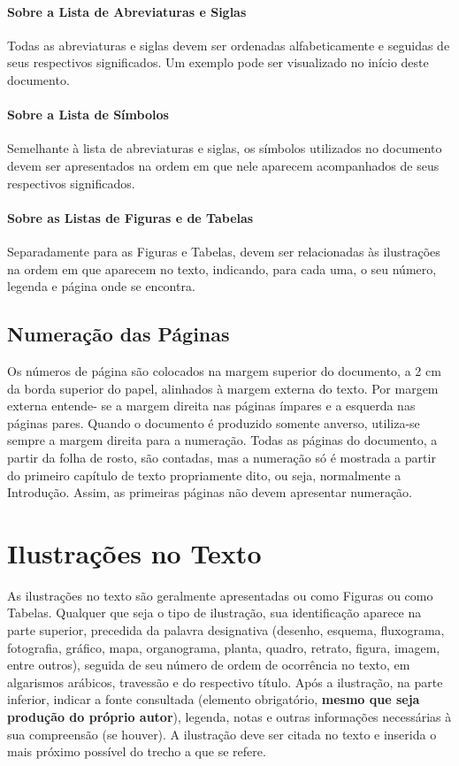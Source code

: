 \documentclass[ppgc,diss]{iiufrgs}
\begin{document}
\subsubsection{Sobre a Lista de Abreviaturas e Siglas}
Todas as abreviaturas e siglas devem ser ordenadas alfabeticamente e seguidas de seus
respectivos significados. Um exemplo pode ser visualizado no início deste documento.

\subsubsection{Sobre a Lista de Símbolos}
Semelhante à lista de abreviaturas e siglas, os símbolos utilizados no documento
devem ser apresentados na ordem em que nele aparecem acompanhados de seus respectivos
significados.

\subsubsection{Sobre as Listas de Figuras e de Tabelas}
Separadamente para as Figuras e Tabelas, devem ser relacionadas às ilustrações na
ordem em que aparecem no texto, indicando, para cada uma, o seu número, legenda e página
onde se encontra.

\section{Numeração das Páginas}
Os números de página são colocados na margem superior do documento, a 2 cm da
borda superior do papel, alinhados à margem externa do texto. Por margem externa entende-
se a margem direita nas páginas ímpares e a esquerda nas páginas pares. Quando o documento
é produzido somente anverso, utiliza-se sempre a margem direita para a numeração. Todas as
páginas do documento, a partir da folha de rosto, são contadas, mas a numeração só é
mostrada a partir do primeiro capítulo de texto propriamente dito, ou seja, normalmente a
Introdução. Assim, as primeiras páginas não devem apresentar numeração.



\chapter{Ilustrações no Texto}
As ilustrações no texto são geralmente apresentadas ou como Figuras ou como
Tabelas. Qualquer que seja o tipo de ilustração, sua identificação aparece na
parte superior, precedida da palavra designativa (desenho, esquema, fluxograma,
fotografia, gráfico, mapa, organograma, planta, quadro, retrato, figura,
imagem, entre outros), seguida de seu número de ordem de ocorrência no texto,
em algarismos arábicos, travessão e do respectivo título. Após a ilustração, na
parte inferior, indicar a fonte consultada (elemento obrigatório,
\textbf{mesmo que seja produção do próprio autor}), legenda, notas e outras
informações necessárias à sua compreensão (se houver). A ilustração deve ser
citada no texto e inserida o mais próximo possível do trecho a que se refere.
\end{document}
